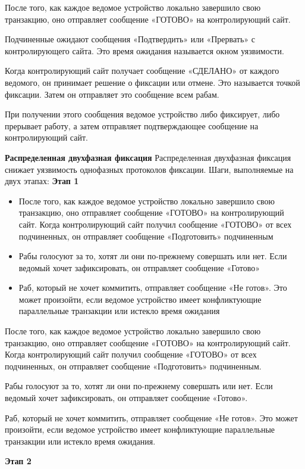 После того, как каждое ведомое устройство локально завершило свою транзакцию, оно отправляет сообщение
«ГОТОВО» на контролирующий сайт.

Подчиненные ожидают сообщения «Подтвердить» или «Прервать» с контролирующего сайта. Это время ожидания
называется окном уязвимости.

Когда контролирующий сайт получает сообщение «СДЕЛАНО» от каждого ведомого, он принимает решение о
фиксации или отмене. Это называется точкой фиксации. Затем он отправляет это сообщение всем рабам.

При получении этого сообщения ведомое устройство либо фиксирует, либо прерывает работу,
а затем отправляет подтверждающее сообщение на контролирующий сайт.

\bigbreak
\textbf{Распределенная двухфазная фиксация}
Распределенная двухфазная фиксация снижает уязвимость однофазных протоколов фиксации. Шаги, выполняемые на двух этапах:
\bigbreak
\textbf{Этап 1}
\begin{itemize}
    \item После того, как каждое ведомое устройство локально завершило свою транзакцию,
    оно отправляет сообщение «ГОТОВО» на контролирующий сайт. Когда контролирующий сайт получил сообщение «ГОТОВО»
    от всех подчиненных, он отправляет сообщение «Подготовить» подчиненным
    \item Рабы голосуют за то, хотят ли они по-прежнему совершать или нет. Если ведомый
    хочет зафиксировать, он отправляет сообщение «Готово»
    \item Раб, который не хочет коммитить, отправляет сообщение «Не готов». Это может произойти,
    если ведомое устройство имеет конфликтующие параллельные транзакции или истекло время ожидания
\end{itemize}

После того, как каждое ведомое устройство локально завершило свою транзакцию, оно отправляет
сообщение «ГОТОВО» на контролирующий сайт. Когда контролирующий сайт получил сообщение «ГОТОВО» от всех подчиненных,
он отправляет сообщение «Подготовить» подчиненным.

Рабы голосуют за то, хотят ли они по-прежнему совершать или нет. Если ведомый хочет зафиксировать,
он отправляет сообщение «Готово».

Раб, который не хочет коммитить, отправляет сообщение «Не готов». Это может произойти, если ведомое
устройство имеет конфликтующие параллельные транзакции или истекло время ожидания.

\textbf{Этап 2}

